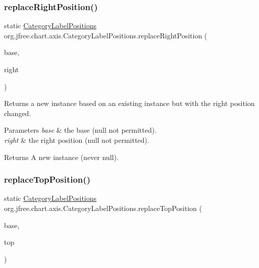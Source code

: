 \subsubsection{\texorpdfstring{replace\+Right\+Position()}{replaceRightPosition()}}
{\footnotesize\ttfamily static \mbox{\hyperlink{classorg_1_1jfree_1_1chart_1_1axis_1_1_category_label_positions}{Category\+Label\+Positions}} org.\+jfree.\+chart.\+axis.\+Category\+Label\+Positions.\+replace\+Right\+Position (\begin{DoxyParamCaption}\item[{\mbox{\hyperlink{classorg_1_1jfree_1_1chart_1_1axis_1_1_category_label_positions}{Category\+Label\+Positions}}}]{base,  }\item[{\mbox{\hyperlink{classorg_1_1jfree_1_1chart_1_1axis_1_1_category_label_position}{Category\+Label\+Position}}}]{right }\end{DoxyParamCaption})\hspace{0.3cm}{\ttfamily [static]}}

Returns a new instance based on an existing instance but with the right position changed.


\begin{DoxyParams}{Parameters}
{\em base} & the base ({\ttfamily null} not permitted). \\
\hline
{\em right} & the right position ({\ttfamily null} not permitted).\\
\hline
\end{DoxyParams}
\begin{DoxyReturn}{Returns}
A new instance (never {\ttfamily null}). 
\end{DoxyReturn}
\mbox{\label{classorg_1_1jfree_1_1chart_1_1axis_1_1_category_label_positions_ae94a06a123d7e602fd7c58caabce751b}} 
\subsubsection{\texorpdfstring{replace\+Top\+Position()}{replaceTopPosition()}}
{\footnotesize\ttfamily static \mbox{\hyperlink{classorg_1_1jfree_1_1chart_1_1axis_1_1_category_label_positions}{Category\+Label\+Positions}} org.\+jfree.\+chart.\+axis.\+Category\+Label\+Positions.\+replace\+Top\+Position (\begin{DoxyParamCaption}\item[{\mbox{\hyperlink{classorg_1_1jfree_1_1chart_1_1axis_1_1_category_label_positions}{Category\+Label\+Positions}}}]{base,  }\item[{\mbox{\hyperlink{classorg_1_1jfree_1_1chart_1_1axis_1_1_category_label_position}{Category\+Label\+Position}}}]{top }\end{DoxyParamCaption})\hspace{0.3cm}{\ttfamily [static]}}

